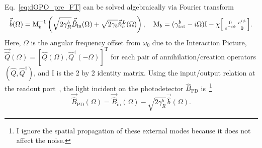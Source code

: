 Eq.~\ref{eq:dOPO_pre_FT} can be solved algebraically via Fourier transform~\cite{} %
\begin{equation}
\label{eq:dOPO_FT_vectorised}
\vec{\hat b}(\Omega)=\text{M}_b^{-1}\left(\sqrt{2\gamma^b_R}\vec{\hat{B}}_\mathrm{in}(\Omega) + \sqrt{2\gamma_b}\vec{\hat{n}}^L_b(\Omega)\right),\quad\text{M}_b=(\gamma^b_\mathrm{tot}-i \Omega)\text{I}-\chi \begin{bsmallmatrix}0 & e^{i\phi} \\e^{-i\phi} & 0\end{bsmallmatrix}.
\end{equation}
Here, $\Omega$ is the angular frequency offset from $\omega_0$ due to the Interaction Picture, %
$\vec{\hat{Q}}(\Omega)=[\hat{Q}(\Omega),\hat{Q}^\dag(-\Omega)]^\text{T}$ for each pair of annihilation/creation operators $(\hat Q, \hat Q^\dag)$, and $\text{I}$ is the 2 by 2 identity matrix.
Using the input/output relation at the readout port~\cite{}, %
the light incident on the photodetector $\hat B_\text{PD}$ is~\footnote{I ignore the spatial propagation of these external modes because it does not affect the noise.}
\begin{equation}
\label{eq:dOPO_IO}\vec{\hat{B}}_\mathrm{PD}(\Omega)=\vec{\hat{B}}_\mathrm{in}(\Omega)-\sqrt{2\gamma^b_R}\vec{\hat b}(\Omega).
\end{equation} 
